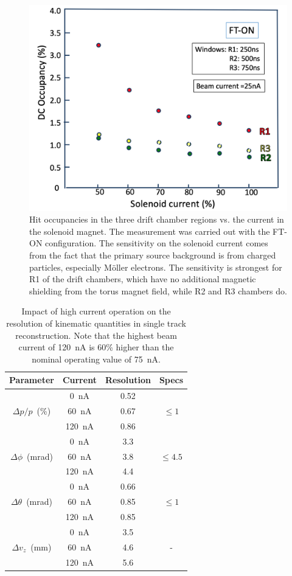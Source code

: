 \documentclass[final,3p,twocolumn]{elsarticle}
\begin{document}
\begin{figure}[t!]
\centerline{\includegraphics[width=1.0\columnwidth]{occupancy-solenoid.png}}
\caption{Hit occupancies in the three drift chamber regions vs. the current in the solenoid magnet. The
  measurement was carried out with the FT-ON configuration. The sensitivity on the solenoid current comes from
  the fact that the primary source background is from charged particles, especially M{\"o}ller electrons. The
  sensitivity is strongest for R1 of the drift chambers, which have no additional magnetic shielding from the torus
  magnet field, while R2 and R3 chambers do.}
\label{occupancies2}
\end{figure}

\begin{table}[htbp!]
\begin{center}
\begin{tabular}{c|c|c|c} \hline
  Parameter & Current & Resolution &Specs \\ \hline
  & 0~nA  & 0.52 & \\
$\Delta{p}/p$~(\%) &60~nA &  0.67& $\le 1$\\
& 120~nA &  0.86 &  \\ \hline 
&0~nA &  3.3 &  \\
$\Delta \phi$~(mrad)& 60~nA &  3.8 &  $\le 4.5$\\
&120~nA  & 4.4 &  \\ \hline
&0~nA &  0.66 &  \\
$\Delta \theta$~(mrad)& 60~nA &  0.85 &  $\le 1$\\
&120~nA  & 0.85 &  \\ \hline
& 0~nA & 3.5 &  \\
$\Delta{v_z}$~(mm) & 60~nA & 4.6 & -  \\
& 120~nA & 5.6 & \\ \hline
\end{tabular}
\caption{Impact of high current operation on the resolution of kinematic quantities in single track reconstruction.
  Note that the highest beam current of 120~nA is 60\% higher than the nominal operating value of 75~nA.}     
\label{resolution}
\end{center}
\end{table}
\end{document}
